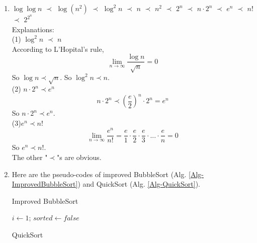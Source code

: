 \documentclass[12pt,a4paper]{article}
\makeatletter
\newtheorem*{solution}{Solution}
\theoremstyle{definition}
\renewenvironment{solution}[1][Solution] {\par\pushQED{\qed}\normalfont\topsep6\p@\@plus6\p@\relax\trivlist\item[\hskip\labelsep\bfseries#1\@addpunct{.}]\ignorespaces}{\popQED\endtrivlist\@endpefalse} \makeatother
\makeatother
\begin{document}
\begin{enumerate}
    \begin{solution}
    	$\log\log n$ $\prec$ $\log (n^2)$ $\prec$ $\log^2 n$ $\prec$ $n$ $\prec$ $n^2$ $\prec$ $2^n$ $\prec$ $n\cdot 2^n$ $\prec$ $e^n$ $\prec$ $n!$ $\prec$ $2^{2^n}$ \\
    	Explanations:\\
    	(1) $\log^2 n$ $\prec$ $n$\\
    	According to L'Hopital's rule, \\
    	\[\lim_{n \to \infty}\frac{\log n}{\sqrt{n}} = 0
    	\]
    	So $\log n \prec \sqrt{n}$. 
    	So $\log^2 n \prec n$. \\
    	(2) $n\cdot 2^n \prec e^n$\\
    	\[n\cdot 2^n \prec (\frac{e}{2})^n\cdot 2^n = e^n
    	\]
    	So $n\cdot 2^n \prec e^n$.\\
    	(3)$e^n \prec n!$\\
    	\[\lim_{n \to \infty}\frac{e^n}{n!} = \frac{e}{1}\cdot \frac{e}{2}\cdot \frac{e}{3}\cdot...\cdot \frac{e}{n} = 0
    	\]
    	So $e^n \prec n!$.\\
    	The other "$\prec$"s are obvious. 
    \end{solution}
	
	\item Here are the pseudo-codes of improved BubbleSort (Alg. \ref{Alg-ImprovedBubbleSort}) and QuickSort (Alg. \ref{Alg-QuickSort}).
	
	\begin{minipage}[t]{0.46\textwidth}
		\begin{algorithm}[H]
			
			\BlankLine
			\caption{Improved BubbleSort}\label{Alg-ImprovedBubbleSort}
			
			$i\leftarrow 1$; $sorted\leftarrow false$\;
			
		\end{algorithm}
	\end{minipage}
	\hfill
	\begin{minipage}[t]{0.46\textwidth}
		\begin{algorithm}[H]
			
			\BlankLine
			\caption{QuickSort}\label{Alg-QuickSort}
			

\end{algorithm}
\end{minipage}
\end{enumerate}
\end{document}
